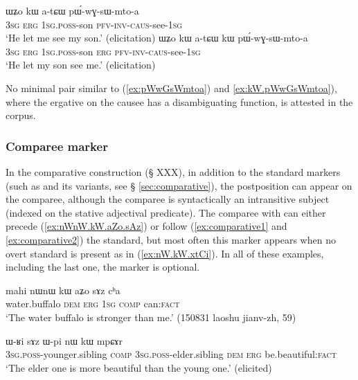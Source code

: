 \begin{exe}
\ex
\begin{xlist}
\ex \label{ex:pWwGsWmtoa}
 \gll ɯʑo kɯ a-tɕɯ pɯ́-wɣ-sɯ-mto-a \\
\textsc{3sg} \textsc{erg} \textsc{1sg}.\textsc{poss}-son  \textsc{pfv}-\textsc{inv}-\textsc{caus}-see-\textsc{1sg} \\
\glt `He let me see my son.' (elicitation)
\ex \label{ex:kW.pWwGsWmtoa}
 \gll ɯʑo kɯ a-tɕɯ kɯ pɯ́-wɣ-sɯ-mto-a \\
\textsc{3sg} \textsc{erg} \textsc{1sg}.\textsc{poss}-son \textsc{erg} \textsc{pfv}-\textsc{inv}-\textsc{caus}-see-\textsc{1sg} \\
\glt `He let my son see me.' (elicitation)
\end{xlist}
\end{exe}

No minimal pair similar to (\ref{ex:pWwGsWmtoa}) and \ref{ex:kW.pWwGsWmtoa}), where the ergative on the causee has a disambiguating function, is attested in the corpus.


\subsubsection{Comparee marker} \label{sec:comparee.kW}
In the comparative construction (§ XXX), in addition to the standard markers (such as  and its variants, see § \ref{sec:comparative}), the postposition  can appear on the comparee, although the comparee is syntactically an intransitive subject  (indexed on the stative adjectival predicate). The comparee with   can either precede (\ref{ex:nWnW.kW.aZo.sAz}) or follow (\ref{ex:comparative1} and \ref{ex:comparative2}) the standard, but most often this marker appears when no overt standard is present as in (\ref{ex:nW.kW.xtCi}). In all of these examples, including the last one, the marker    is optional.

\begin{exe}
\ex \label{ex:nWnW.kW.aZo.sAz}
 \gll mahi nɯnɯ kɯ aʑo sɤz cʰa \\ 
water.buffalo \textsc{dem} \textsc{erg} \textsc{1sg} \textsc{comp} can:\textsc{fact} \\ 
\glt `The water buffalo is stronger than me.'  (150831 laoshu jianv-zh, 59)
\end{exe}

\begin{exe}
\ex \label{ex:comparative1}
\gll  ɯ-ʁi sɤz ɯ-pi nɯ kɯ mpɕɤr  \\
\textsc{3sg.poss}-younger.sibling \textsc{comp} \textsc{3sg.poss}-elder.sibling \textsc{dem} \textsc{erg} be.beautiful:\textsc{fact} \\
\glt `The elder one is more beautiful than the young one.' (elicited)
\end{exe}
 
